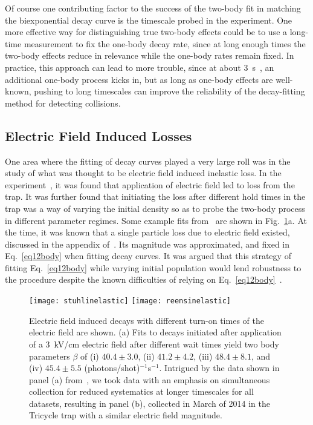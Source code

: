 Of course one contributing factor to the success of the two-body fit in matching the biexponential decay curve is the timescale probed in the experiment.
One more effective way for distinguishing true two-body effects could be to use a long-time measurement to fix the one-body decay rate, since at long enough times the two-body effects reduce in relevance while the one-body rates remain fixed.
In practice, this approach can lead to more trouble, since at about $3$~s~\cite{Hoekstra2007}, an additional one-body process kicks in, but as long as one-body effects are well-known, pushing to long timescales can improve the reliability of the decay-fitting method for detecting collisions.

\subsection{Electric Field Induced Losses}

One area where the fitting of decay curves played a very large roll was in the study of what was thought to be electric field induced inelastic loss.
In the experiment~\cite{Stuhl2013}, it was found that application of electric field led to loss from the trap. 
It was further found that initiating the loss after different hold times in the trap was a way of varying the initial density so as to probe the two-body process in different parameter regimes.
Some example fits from~\cite{Stuhl2013} are shown in Fig.~\ref{efielddecay}a.
At the time, it was known that a single particle loss due to electric field existed, discussed in the appendix of~\cite{Stuhl2013}.
Its magnitude was approximated, and fixed in Eq.~\ref{eq12body} when fitting decay curves.
It was argued that this strategy of fitting Eq.~\ref{eq12body} while varying initial population would lend robustness to the procedure despite the known difficulties of relying on Eq.~\ref{eq12body}~\citep[Page.~1800, bottom right]{Stuhl2013}.

\begin{figure}[t!]
\centering
\vspace{0.5mm}
\texttt{[image: stuhlinelastic]}
\texttt{[image: reensinelastic]}
\caption[Electric Field Induced Decays]{
Electric field induced decays with different turn-on times of the electric field are shown.
(a) Fits to decays initiated after application of a $3$~kV/cm electric field after different wait times yield two body parameters $\beta$ of (i) $40.4\pm3.0$, (ii) $41.2\pm4.2$, (iii) $48.4\pm8.1$, and (iv) $45.4\pm5.5$ (photons/shot)$^{-1}$s$^{-1}$. 
Intrigued by the data shown in panel (a) from~\cite{Stuhl2013}, we took data with an emphasis on simultaneous collection for reduced systematics at longer timescales for all datasets, resulting in panel (b), collected in March of 2014 in the Tricycle trap with a similar electric field magnitude.
\label{efielddecay}}
\end{figure}

